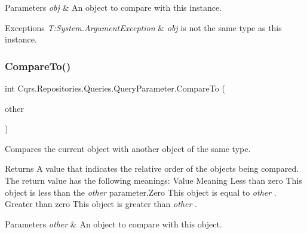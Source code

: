 \begin{DoxyParams}{Parameters}
{\em obj} & An object to compare with this instance. \\
\hline
\end{DoxyParams}

\begin{DoxyExceptions}{Exceptions}
{\em T\+:\+System.\+Argument\+Exception} & {\itshape obj}  is not the same type as this instance. \\
\hline
\end{DoxyExceptions}
\mbox{\label{classCqrs_1_1Repositories_1_1Queries_1_1QueryParameter_a48fa36fe6189bb03008b7f9fa3d30267}} 
\subsubsection{\texorpdfstring{Compare\+To()}{CompareTo()}\hspace{0.1cm}{\footnotesize\ttfamily [2/2]}}
{\footnotesize\ttfamily int Cqrs.\+Repositories.\+Queries.\+Query\+Parameter.\+Compare\+To (\begin{DoxyParamCaption}\item[{\hyperlink{classCqrs_1_1Repositories_1_1Queries_1_1QueryParameter}{Query\+Parameter}}]{other }\end{DoxyParamCaption})}



Compares the current object with another object of the same type. 

\begin{DoxyReturn}{Returns}
A value that indicates the relative order of the objects being compared. The return value has the following meanings\+: Value Meaning Less than zero This object is less than the {\itshape other}  parameter.\+Zero This object is equal to {\itshape other} . Greater than zero This object is greater than {\itshape other} . 
\end{DoxyReturn}

\begin{DoxyParams}{Parameters}
{\em other} & An object to compare with this object.\\
\hline
\end{DoxyParams}
\mbox{\label{classCqrs_1_1Repositories_1_1Queries_1_1QueryParameter_a14f2f14cba8d0807bb80d7b8d2c7e59a}} 
